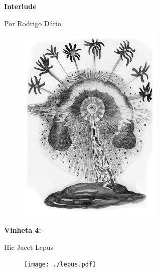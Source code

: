 \begin{absolutelynopagebreak}
\textbf{Interlude}

Por Rodrigo Dário


\begin{vplace}
\begin{figure}[H]
  \centering
  \vspace*{6cm}
  \includegraphics[width=70mm]{./imgs/caparc5.jpg}  

\end{figure}
\end{vplace}

\end{absolutelynopagebreak}

\pagebreak

\begin{absolutelynopagebreak}
\textbf{Vinheta 4:}

Hic Jacet Lepus

\thispagestyle{empty}

\begin{vplace}
\begin{figure}[H]
\begin{adjustwidth}{8.1cm}{}
  \vspace*{14.44cm}
  \texttt{[image: ./lepus.pdf]}  
\end{adjustwidth}

\end{figure}
\end{vplace}

\end{absolutelynopagebreak}

